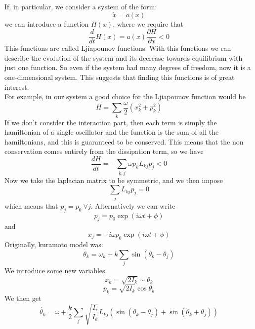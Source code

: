 If, in particular, we consider a system of the form:
$$
	\dot{x} = a(x)
$$
we can introduce a function $H(x)$, where we require that
$$
	\frac{d}{dt}H(x) = a(x)\frac{\partial H}{\partial x} < 0
$$
This functions are called Ljiapounov functions. With this functions we can describe the evolution of the system and its decrease towards equilibrium with just one function. So even if the system had many degrees of freedom, now it is a one-dimensional system. This suggests that finding this functions is of great interest. \\
For example, in our system a good choice for the Ljiapounov function would be
$$
	H = \sum_k \frac{\omega}{2}(x^2_k + p^2_k)
$$
If we don't consider the interaction part, then each term is simply the hamiltonian of a single oscillator and the function is the sum of all the hamiltonians, and this is guaranteed to be conserved. This means that the non conservation comes entirely from the dissipation term, so we have
$$
	\frac{dH}{dt} = -\sum_{k,j} \omega p_k L_{kj}p_j < 0
$$
Now we take the laplacian matrix to be symmetric, and we then impose
$$
	\sum_j L_{kj}p_j = 0
$$
which means that $p_j = p_0 \ \forall j$. Alternatively we can write
$$
	p_j = p_0 \exp(i\omega t + \phi)
$$
and
$$
	x_j = -i\omega p_0 \exp(i\omega t + \phi)
$$
Originally, kuramoto model was:
$$
	\dot{\theta_k} = \omega_k + k\sum_j \sin(\theta_k - \theta_j)
$$
We introduce some new variables 
$$
	x_k = \sqrt{2I_k} \sim \theta_k
$$
$$
	p_k = \sqrt{2I_k} \cos \theta_k
$$
We then get
$$
	\dot{\theta_k} = \omega + \frac{k}{2}\sum_j \sqrt{\frac{I_i}{I_k}}L_{kj}(\sin(\theta_k - \theta_j) + \sin(\theta_k + \theta_j))
$$


